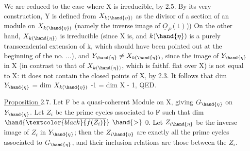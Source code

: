 
We are reduced to the case where X is irreducible, by 2.5. By its very construction,
Y is defined from $X_{k(\hand{\eta})}$ as the divisor of a section
of an  module on $X_{k(\hand{\eta})}$ (namely the inverse image of $\underline{O}_P(1)$))
On the other hand, $X_{k(\hand{\eta})}$ is irreducible (since X is, and $k(\hand{\eta})$ is a
 purely transcendental extension of k, which should have been pointed out at the beginning of the
no. ...), and $Y_{\hand{\eta}} \neq X_{k(\hand{\eta})}$, since the image of $Y_{\hand{\eta}}$ in X (in contrast
to that of $X_{k(\hand{\eta})}$, which is faithf. flat over X) is not equal to X: it does not
contain the closed points of X, by 2.3. It follows that
dim $Y_{\hand{\eta}}$ = dim $X_{k(\hand{\eta})}$ -1  = dim X - 1, QED.

\uline{Proposition }2.7. Let F be a quasi-coherent Module on X, giving $G_{\hand{\eta}}$ on $Y_{\hand{\eta}}$.
Let $Z_i$ be the prime cycles associated to F such that dim $\hand{\overline{\textcolor{black}{f(Z_i)}}}$ $\hand{>}$ 0. Let
$Z_{i\hand{\eta}}$ be the inverse image of $Z_i$ in $Y_{\hand{\eta}}$; then the $Z_{i\hand{\eta}}$ are exactly all
the prime cycles associated to $G_{\hand{\eta}}$, and their inclusion relations
are those between the $Z_i$.

